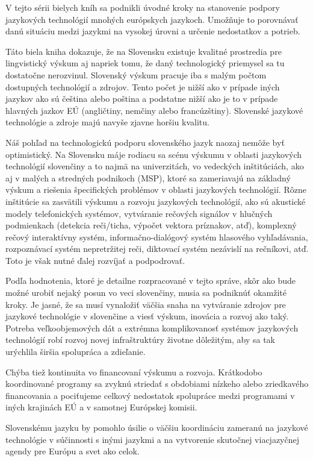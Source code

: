 V tejto sérii bielych kníh sa podnikli úvodné kroky na stanovenie podpory jazykových technológií mnohých európskych jazykoch. Umožňuje to porovnávať danú situáciu medzi jazykmi na vysokej úrovni a určenie nedostatkov a potrieb.

Táto biela kniha dokazuje, že na Slovensku existuje kvalitné prostredia pre lingvistický výskum aj napriek tomu, že daný technologický priemysel sa tu dostatočne nerozvinul. Slovenský výskum pracuje iba s malým počtom dostupných technológií a zdrojov. Tento počet je nižší ako v prípade iných jazykov ako sú čeština alebo poština a podstatne nižší ako je to v prípade hlavných jazkov EÚ (angličtiny, nemčiny alebo francúzštiny). Slovenské jazykové technológie a zdroje majú navyše zjavne horšiu kvalitu.

Náš pohľad na technologickú podporu slovenského jazyk naozaj nemôže byť optimistický. Na Slovensku máje rodiacu sa scénu výskumu v oblasti jazykových technológií slovenčiny a to najmä na univerzitách, vo vedeckých inštitúciách, ako aj v malých a stredných podnikoch (MSP), ktoré sa zameriavajú na základný výskum a riešenia špecifických problémov v oblasti jazykových technológií. Rôzne inštitúcie sa zasvätili výskumu a rozvoju jazykových technológií, ako sú akustické modely telefonických systémov, vytváranie rečových signálov v hlučných podmienkach (detekcia reči/ticha, výpočet vektora príznakov, atď), komplexný rečový interaktívny systém, informačno-dialógový systém hlasového vyhľadávania, rozpoznávací systém nepretržitej reči, diktovací systém nezávislí na rečníkovi, atď. Toto je však nutné ďalej rozvíjať a podpodrovať.

Podľa hodnotenia, ktoré je detailne rozpracované v tejto správe, skôr ako bude možné urobiť nejaký posun vo veci  slovenčiny, musia sa podniknúť okamžité kroky. Je jasné, že sa musí vynaložiť väčšia snaha na vytváranie zdrojov pre jazykové technológie v slovenčine a viesť výskum, inovácia a rozvoj ako taký. Potreba veľkoobjemových dát a extrémna komplikovanosť systémov jazykových technológií robí rozvoj novej infraštruktúry životne dôležitým, aby sa tak urýchlila širšia spolupráca a zdieľanie.

Chýba tiež kontinuita vo financovaní výskumu a rozvoja. Krátkodobo koordinované programy sa zvyknú striedať s obdobiami nízkeho alebo zriedkavého financovania a pociťujeme celkový nedostatok spolupráce medzi programami v iných krajinách EÚ a v samotnej Európskej komisii.

Slovenskému jazyku by pomohlo úsilie o väčšiu koordináciu
zameranú na jazykové technológie v súčinnosti s inými jazykmi a na
vytvorenie skutočnej viacjazyčnej agendy pre Európu a svet ako
celok.
